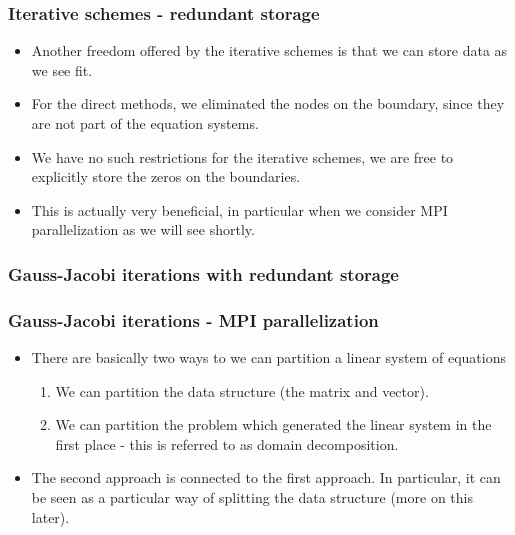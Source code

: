 \documentclass{beamer}
\begin{document}
\begin{frame}\frametitle{Iterative schemes - redundant storage}
  \begin{itemize}
    \item Another freedom offered by the iterative schemes is that we can store data as we see fit.
    \item For the direct methods, we eliminated the nodes on the boundary, since they are not
      part of the equation systems.
    \item We have no such restrictions for the iterative schemes, we are free to explicitly store the
      zeros on the boundaries.
    \item This is actually very beneficial, in particular when we consider MPI parallelization as we will see shortly.
  \end{itemize}
\end{frame}
\begin{frame}\frametitle{Gauss-Jacobi iterations with redundant storage}
   
\end{frame}
\begin{frame}\frametitle{Gauss-Jacobi iterations - MPI parallelization}
  \begin{itemize}
    \item There are basically two ways to we can partition a linear system of equations
      \begin{enumerate}
        \item We can partition the data structure (the matrix and vector).
        \item We can partition the problem which generated the linear system in the first place - this is referred to as domain decomposition.
      \end{enumerate}
    \item The second approach is connected to the first approach.
          In particular, it can be seen as a particular way of splitting the data structure (more on this later).
  \end{itemize}
\end{frame}
\end{document}
